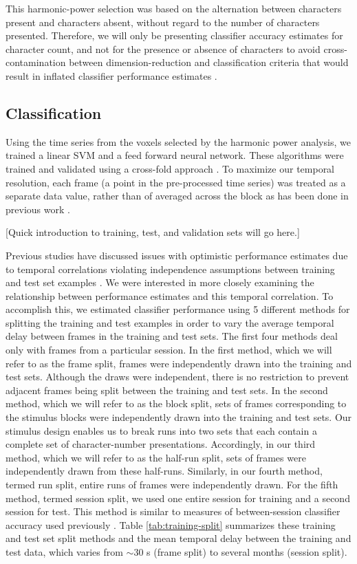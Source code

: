 \documentclass[preprint,authoryear,12pt]{elsarticle}
\begin{document}
This harmonic-power selection was based on the alternation between characters present and characters absent, without regard to the number of characters presented. 
Therefore, we will only be presenting classifier accuracy estimates for character count, and not for the presence or absence of characters to avoid cross-contamination between dimension-reduction and  classification criteria that would result in inflated classifier performance estimates \citep{CrossContamination}.

\subsection{Classification}
Using the time series from the voxels selected by the harmonic power analysis, we trained a linear SVM and a feed forward neural network.
These algorithms were trained and validated using a cross-fold approach \citep{Kohavi1995}.
To maximize our temporal resolution, each frame (a point in the pre-processed time series) was treated as a separate data value, rather than of averaged across the block as has been done in previous work \citep{BlockAveraging}.

[Quick introduction to training, test, and validation sets will go here.]

Previous studies have discussed issues with optimistic performance estimates due to temporal correlations violating independence assumptions between training and test set examples \citep{Pereira2009}.
We were interested in more closely examining the relationship between performance estimates and this temporal correlation.
To accomplish this, we estimated classifier performance using 5 different methods for splitting the training and test examples in order to vary the average temporal delay between frames in the training and test sets. 
The first four methods deal only with frames from a particular session.
In the first method, which we will refer to as the frame split, frames were independently drawn into the training and test sets. 
Although the draws were independent, there is no restriction to prevent adjacent frames being split between the training and test sets.
In the second method, which we will refer to as the block split, sets of frames corresponding to the stimulus blocks were independently drawn into the training and test sets.
Our stimulus design enables us to break runs into two sets that each contain a complete set of character-number presentations. 
Accordingly, in our third method, which we will refer to as the half-run split, sets of frames were independently drawn from these half-runs. 
Similarly, in our fourth method, termed run split, entire runs of frames were independently drawn. 
For the fifth method, termed session split, we used one entire session for training and a second session for test.
This method is similar to measures of between-session classifier accuracy used previously \citep{BetweenSessionAccuracy}.
Table \ref{tab:training-split} summarizes these training and test set split methods and the mean temporal delay between the training and test data, which varies from $\sim$30 s (frame split) to several months (session split).
\end{document}
